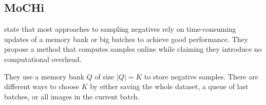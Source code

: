 \subsection{MoCHi}\label{subsec:MoCHi}

\citet{mochi_2020} state that most approaches to sampling negatives rely on 
time-consuming updates of a memory bank or big batches to achieve good performance.
They propose a method that computes samples online while claiming they introduce no computational overhead.

They use a memory bank $Q$ of size $| Q | = K$ to store negative samples.
There are different ways to choose $K$ by either saving the whole dataset, a queue of last batches,
or all images in the current batch.

